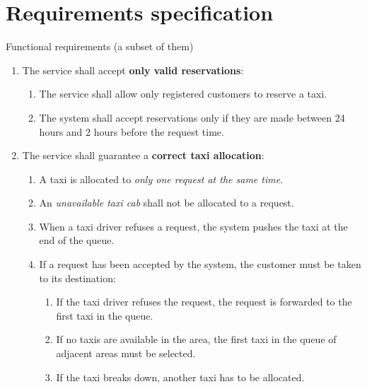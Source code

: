    \section{Requirements specification} 


\begin{frame}[allowframebreaks]{Functional requirements (a subset of them)}

\begin{enumerate}
			
	\item The service shall accept \textbf{only valid reservations}: \begin{enumerate}
		\item The service shall allow only registered customers to reserve a taxi.
		\item The system shall accept reservations only if they are made between 24 hours and 2 hours before the request time.
	\end{enumerate}


\framebreak	


	\item The service shall guarantee a \textbf{correct taxi allocation}: \begin{enumerate}
		\item A taxi is allocated to \emph{only one request at the same time}.
		\item An \emph{unavailable taxi cab} shall not be allocated to a request.
		\item When a taxi driver refuses a request, the system pushes the taxi at the end of the queue.
		\item If a request has been accepted by the system, the customer must be taken to its destination: \begin{enumerate}
			\item If the taxi driver refuses the request, the request is forwarded to the first taxi in the queue.
			\item If no taxis are available in the area, the first taxi in the queue of adjacent areas must be selected.
			\item If the taxi breaks down, another taxi has to be allocated.
		\end{enumerate}
	\end{enumerate}
 
\end{enumerate}
\end{frame}
